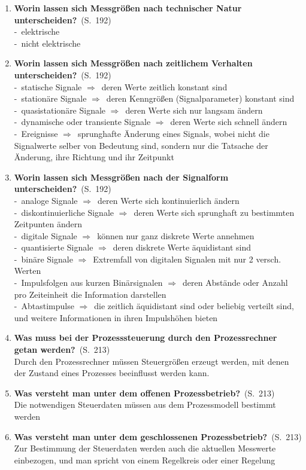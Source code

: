 \documentclass[a4paper,12pt]{article}
\newcommand{\question}[3]{\pagebreak[3]\item {\textbf{#1?}}\ (S.\ #2)#3}
\newcommand{\catchword}[1]{\\-\ #1}
\newcommand{\normaltext}[1]{\\#1}
\newcommand{\resultol}[1]{ $\Rightarrow$\ #1}
\newcommand{\page}[1]{#1}
\begin{document}
\begin{enumerate}
     \question{Worin lassen sich Messgrößen nach technischer Natur unterscheiden}{\page{192}}
  {
    \catchword{elektrische}
    \catchword{nicht elektrische}
  }
  
     \question{Worin lassen sich Messgrößen nach zeitlichem Verhalten unterscheiden}{\page{192}}
  {
    \catchword{statische Signale \resultol{deren Werte zeitlich konstant sind}}
    \catchword{stationäre Signale \resultol{deren Kenngrößen (Signalparameter) konstant sind}}
    \catchword{quasistationäre Signale \resultol{deren Werte sich nur langsam ändern}}
    \catchword{dynamische oder transiente Signale \resultol{deren Werte sich schnell ändern}}
    \catchword{Ereignisse \resultol{sprunghafte Änderung eines Signals, wobei nicht die Signalwerte 
    selber von Bedeutung sind, sondern nur die Tatsache der Änderung, ihre Richtung und ihr Zeitpunkt}}
  }
  
     \question{Worin lassen sich Messgrößen nach der Signalform unterscheiden}{\page{192}}
  {
    \catchword{analoge Signale \resultol{deren Werte sich kontinuierlich ändern}}
    \catchword{diskontinuierliche Signale \resultol{deren Werte sich sprunghaft zu bestimmten Zeitpunten ändern}}
    \catchword{digitale Signale \resultol{können nur ganz diskrete Werte annehmen}}
    \catchword{quantisierte Signale \resultol{deren diskrete Werte äquidistant sind}}
    \catchword{binäre Signale \resultol{Extremfall von digitalen Signalen mit nur 2 versch. Werten}}
    \catchword{Impulsfolgen aus kurzen Binärsignalen \resultol{deren Abstände oder Anzahl pro 
    Zeiteinheit die Information darstellen}}
    \catchword{Abtastimpulse \resultol{die zeitlich äquidistant sind oder beliebig verteilt sind,
    und weitere Informationen in ihren Impulshöhen bieten}}
  }

  \question{Was muss bei der Prozesssteuerung durch den Prozessrechner getan werden}{\page{213}}
  {
    \normaltext{Durch den Prozessrechner müssen Steuergrößen erzeugt werden, mit denen der Zustand
                eines Prozesses beeinflusst werden kann.}
  }

  \question{Was versteht man unter dem offenen Prozessbetrieb}{\page{213}}
  {
    \normaltext{Die notwendigen Steuerdaten müssen aus dem Prozessmodell bestimmt werden}
  }

  \question{Was versteht man unter dem geschlossenen Prozessbetrieb}{\page{213}}
  {
    \normaltext{Zur Bestimmung der Steuerdaten werden auch die aktuellen Messwerte einbezogen,
                und man spricht von einem Regelkreis oder einer Regelung}
  }


\end{enumerate}
\end{document}
